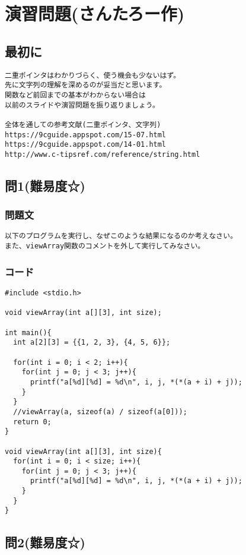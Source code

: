 \section{演習問題(さんたろー作)}
\subsection{最初に}
\begin{verbatim}
二重ポインタはわかりづらく、使う機会も少ないはず。
先に文字列の理解を深めるのが妥当だと思います。
関数など前回までの基本がわからない場合は
以前のスライドや演習問題を振り返りましょう。

全体を通しての参考文献(二重ポインタ、文字列)
https://9cguide.appspot.com/15-07.html
https://9cguide.appspot.com/14-01.html
http://www.c-tipsref.com/reference/string.html
\end{verbatim}
\subsection{問1(難易度☆)}
\subsubsection{問題文}
\begin{verbatim}
以下のプログラムを実行し、なぜこのような結果になるのか考えなさい。
また、viewArray関数のコメントを外して実行してみなさい。
\end{verbatim}

\subsubsection{コード}
\begin{verbatim}
#include <stdio.h>

void viewArray(int a[][3], int size);

int main(){
  int a[2][3] = {{1, 2, 3}, {4, 5, 6}};

  for(int i = 0; i < 2; i++){
    for(int j = 0; j < 3; j++){
      printf("a[%d][%d] = %d\n", i, j, *(*(a + i) + j));
    }
  }
  //viewArray(a, sizeof(a) / sizeof(a[0]));
  return 0;
}

void viewArray(int a[][3], int size){
  for(int i = 0; i < size; i++){
    for(int j = 0; j < 3; j++){
      printf("a[%d][%d] = %d\n", i, j, *(*(a + i) + j));
    }
  }
}
\end{verbatim}

\subsection{問2(難易度☆)}
